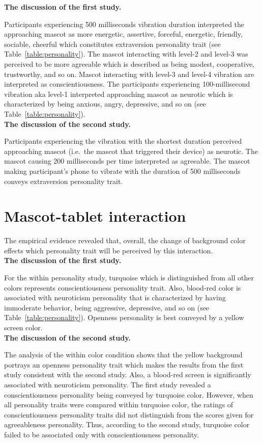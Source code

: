 \textbf{The discussion of the first study.}\par
Participants experiencing 500 milliseconds vibration duration interpreted the approaching mascot as more
energetic, assertive, forceful, energetic, friendly, sociable, cheerful which
constitutes extraversion personality trait (see Table~\ref{table:personality}).
The mascot interacting with level-2 and level-3 was perceived to be more agreeable which
is described as being modest, cooperative, trustworthy, and so on.
Mascot interacting with level-3 and level-4 vibration are interpreted as conscientiousness.
The participants experiencing 100-millisecond vibration aka level-1 interpreted
approaching mascot as neurotic which is characterized by being
anxious, angry, depressive, and so on (see Table~\ref{table:personality}).\\

\textbf{The discussion of the second study.}\par
Participants experiencing the vibration with the shortest duration
perceived approaching mascot (i.e.\ the mascot that triggered their device) as neurotic.
The mascot causing 200 milliseconds per time interpreted as agreeable.
The mascot making participant's phone to vibrate with the duration of 500
milliseconds conveys extraversion personality trait.\\

\section{Mascot-tablet interaction}
\label{sec:mascot-tablet-interaction}
The empirical evidence revealed that, overall, the change of background
color effects which personality trait will be perceived by this interaction.\\

\textbf{The discussion of the first study.}\par
For the within personality study, turquoise which is distinguished from all other
colors represents conscientiousness personality trait.
Also, blood-red color is associated with neuroticism personality that is characterized by
having immoderate behavior, being aggressive, depressive, and so on (see Table~\ref{table:personality}). 
Openness personality is best conveyed by a yellow screen color.\\

\textbf{The discussion of the second study.}\par
The analysis of the within color condition shows that the yellow background portrays an openness
personality trait which makes the results from the first study consistent with the second study.
Also, a blood-red screen is significantly associated with neuroticism personality.
The first study revealed a conscientiousness personality being conveyed by turquoise color.
However, when all personality traits were compared within turquoise color, the ratings
of conscientiousness personality traits did not distinguish from the scores given for
agreeableness personality.
Thus, according to the second study, turquoise color failed to be associated only with conscientiousness personality.

